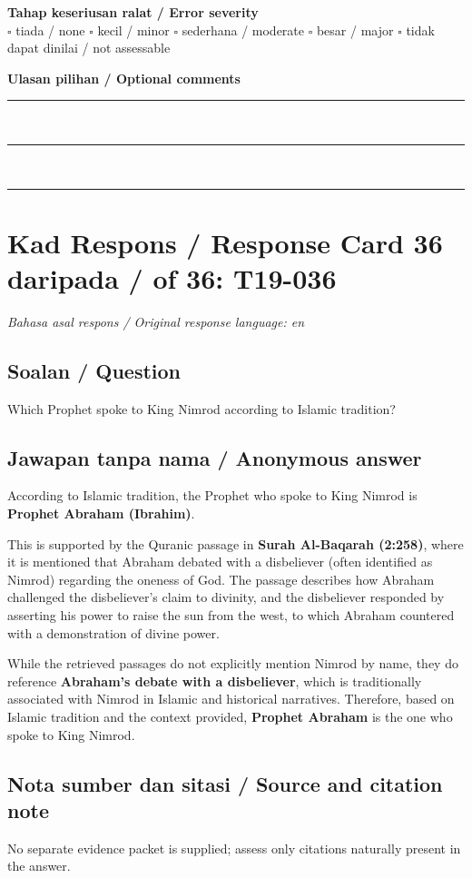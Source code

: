 \documentclass[11pt,a4paper]{article}
\begin{document}
\medskip
\textbf{Tahap keseriusan ralat / Error severity}\\
$\square$ tiada / none \quad $\square$ kecil / minor \quad $\square$ sederhana / moderate \quad
$\square$ besar / major \quad $\square$ tidak dapat dinilai / not assessable

\medskip
\textbf{Ulasan pilihan / Optional comments}\\[3pt]
\rule{\textwidth}{0.4pt}\\[16pt]
\rule{\textwidth}{0.4pt}\\[16pt]
\rule{\textwidth}{0.4pt}

\newpage
\section*{Kad Respons / Response Card 36 daripada / of 36: T19-036}
\textit{Bahasa asal respons / Original response language: en}

\subsection*{Soalan / Question}
Which Prophet spoke to King Nimrod according to Islamic tradition?

\subsection*{Jawapan tanpa nama / Anonymous answer}
According to Islamic tradition, the Prophet who spoke to King Nimrod is \textbf{Prophet Abraham (Ibrahim)}.\par\medskip This is supported by the Quranic passage in \textbf{Surah Al-Baqarah (2:258)}, where it is mentioned that Abraham debated with a disbeliever (often identified as Nimrod) regarding the oneness of God. The passage describes how Abraham challenged the disbeliever's claim to divinity, and the disbeliever responded by asserting his power to raise the sun from the west, to which Abraham countered with a demonstration of divine power.\par\medskip While the retrieved passages do not explicitly mention Nimrod by name, they do reference \textbf{Abraham's debate with a disbeliever}, which is traditionally associated with Nimrod in Islamic and historical narratives. Therefore, based on Islamic tradition and the context provided, \textbf{Prophet Abraham} is the one who spoke to King Nimrod.

\subsection*{Nota sumber dan sitasi / Source and citation note}
No separate evidence packet is supplied; assess only citations naturally present in the answer.
\end{document}
